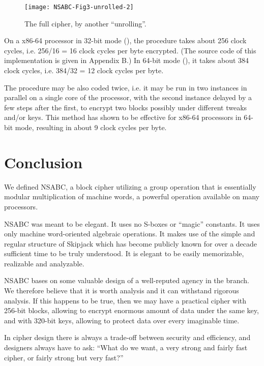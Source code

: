 \documentclass[a4paper,oneside,english]{amsart}
\numberwithin{equation}{section}
\numberwithin{figure}{section}
\begin{document}
\begin{figure}
\texttt{[image: NSABC-Fig3-unrolled-2]}

\caption{\label{fig:The-full-cipher-2}The full cipher, by another {}``unrolling''.}


\end{figure}


On a x86-64 processor in 32-bit mode (), the procedure takes
about 256 clock cycles, i.e. 256/16 = 16 clock cycles per byte encrypted.
(The source code of this implementation is given in Appendix B.) In
64-bit mode (), it takes about 384 clock cycles, i.e. 384/32
= 12 clock cycles per byte.

The procedure may be also coded twice, i.e. it may be run in two instances
in parallel on a single core of the processor, with the second instance
delayed by a few steps after the first, to encrypt two blocks possibly
under different tweaks and/or keys. This method has shown to be effective
for x86-64 processors in 64-bit mode, resulting in about 9 clock cycles
per byte.


\section{Conclusion}

We defined NSABC, a block cipher utilizing a group operation that
is essentially modular multiplication of machine words, a powerful
operation available on many processors.

NSABC was meant to be elegant. It uses no S-boxes or {}``magic''
constants. It uses only machine word-oriented algebraic operations.
It makes use of the simple and regular structure of Skipjack which
has become publicly known for over a decade \textemdash{} sufficient
time to be truly understood. It is elegant to be easily memorizable,
realizable and analyzable.

NSABC bases on some valuable design of a well-reputed agency in the
branch. We therefore believe that it is worth analysis and it can
withstand rigorous analysis. If this happens to be true, then we may
have a practical cipher with 256-bit blocks, allowing to encrypt enormous
amount of data under the same key, and with 320-bit keys, allowing
to protect data over every imaginable time.

In cipher design there is always a trade-off between security and
efficiency, and designers always have to ask: {}``What do we want,
a very strong and fairly fast cipher, or fairly strong but very fast?'' 
\end{document}
